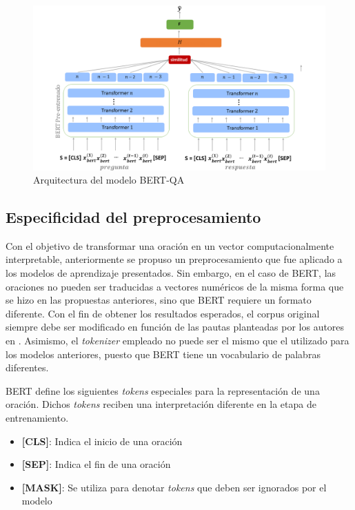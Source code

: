\begin{figure}[!tb]
  \begin{center}
    \includegraphics[angle=0, width=1\textwidth]{Graphics/bert_qa.png}
  \end{center}
    \caption{Arquitectura del modelo BERT-QA}\label{bert_qa}
\end{figure}

\subsection{Especificidad del preprocesamiento}

Con el objetivo de transformar una oración en un vector computacionalmente interpretable, anteriormente se propuso un preprocesamiento que fue aplicado a los modelos de aprendizaje presentados. Sin embargo, en el caso de BERT, las oraciones no pueden ser traducidas a vectores numéricos de la misma forma que se hizo en las propuestas anteriores, sino que BERT requiere un formato diferente. Con el fin de obtener los resultados esperados, el corpus original siempre debe ser modificado en función de las pautas planteadas por los autores en \cite{2018-devlin-bert}. Asimismo, el \textit{tokenizer} empleado no puede ser el mismo que el utilizado para los modelos anteriores, puesto que BERT tiene un vocabulario de palabras diferentes.

BERT define los siguientes \textit{tokens} especiales para la representación de una oración. Dichos \textit{tokens} reciben una interpretación diferente en la etapa de entrenamiento.
\begin{itemize}
  \item \textbf{[CLS]}: Indica el inicio de una oración
  \item \textbf{[SEP]}: Indica el fin de una oración
  \item \textbf{[MASK]}: Se utiliza para denotar \textit{tokens} que deben ser ignorados por el modelo
\end{itemize}

